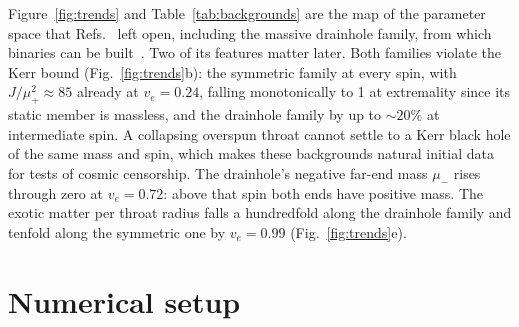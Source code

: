 \documentclass[twocolumn,floatfix,aps,prd,superscriptaddress,nofootinbib]{revtex4-2}
\begin{document}
Figure~\ref{fig:trends} and Table~\ref{tab:backgrounds} are the map of the parameter space that Refs.~\cite{kleihaus_kunz2014,chew2016} left open, including the massive drainhole family, from which binaries can be built~\cite{shirokov2026c}. Two of its features matter later. Both families violate the Kerr bound (Fig.~\ref{fig:trends}b): the symmetric family at every spin, with $J/\mu_+^2\approx85$ already at $v_e=0.24$, falling monotonically to 1 at extremality since its static member is massless, and the drainhole family by up to ${\sim}20\%$ at intermediate spin. A collapsing overspun throat cannot settle to a Kerr black hole of the same mass and spin, which makes these backgrounds natural initial data for tests of cosmic censorship. The drainhole's negative far-end mass $\mu_-$ rises through zero at $v_e=0.72$: above that spin both ends have positive mass. The exotic matter per throat radius falls a hundredfold along the drainhole family and tenfold along the symmetric one by $v_e=0.99$ (Fig.~\ref{fig:trends}e).

\section{Numerical setup}
\label{sec:setup}
\end{document}
